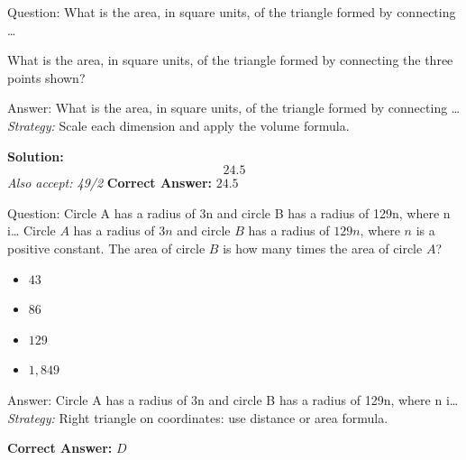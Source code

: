 \documentclass{beamer}
\begin{document}
\begin{frame}{Question: What is the area, in square units, of the triangle formed by connecting …}
\begin{center}
\end{center}




What is the area, in square units, of the triangle formed by connecting the three points shown?
\end{frame}
\begin{frame}{Answer: What is the area, in square units, of the triangle formed by connecting …}
\textit{Strategy:} Scale each dimension and apply the volume formula.

\textbf{Solution:}
\[ \boxed{24.5} \]
\textit{Also accept: 49/2}
\textbf{Correct Answer:} \( \boxed{24.5} \)

\end{frame}
\begin{frame}{Question: Circle A has a radius of 3n and circle B has a radius of 129n, where n i…}
Circle $A$ has a radius of $3n$ and circle $B$ has a radius of $129n$, where $n$ is a positive constant.  
The area of circle $B$ is how many times the area of circle $A$?
\begin{itemize}
    \item[\textbf{A.}] $43$
    \item[\textbf{B.}] $86$
    \item[\textbf{C.}] $129$
    \item[\textbf{D.}] $1,849$
\end{itemize}
\end{frame}
\begin{frame}{Answer: Circle A has a radius of 3n and circle B has a radius of 129n, where n i…}
\textit{Strategy:} Right triangle on coordinates: use distance or area formula.

\textbf{Correct Answer:} \( \boxed{D} \)

\end{frame}
\end{document}
